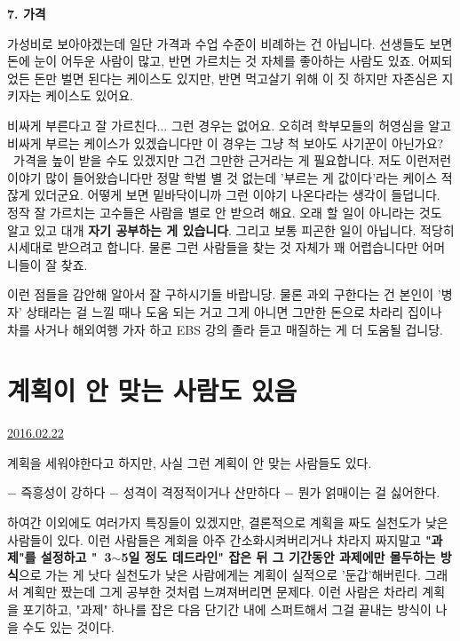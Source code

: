 \textbf{7. 가격}
\vspace{5mm}

가성비로 보아야겠는데 일단 가격과 수업 수준이 비례하는 건 아닙니다.
선생들도 보면 돈에 눈이 어두운 사람이 많고, 반면 가르치는 것 자체를 좋아하는 사람도 있죠.
어찌되었든 돈만 벌면 된다는 케이스도 있지만, 반면 먹고살기 위해 이 짓 하지만 자존심은 지키자는 케이스도 있어요.
\vspace{5mm}

비싸게 부른다고 잘 가르친다... 그런 경우는 없어요. 오히려 학부모들의 허영심을 알고 비싸게 부르는 케이스가 있겠습니다만
이 경우는 그냥 척 보아도 사기꾼이 아닌가요?  가격을 높이 받을 수도 있겠지만 그건 그만한 근거라는 게 필요합니다.
저도 이런저런 이야기 많이 들어왔습니다만 정말 학벌 별 것 없는데 '부르는 게 값이다'라는 케이스 적잖게 있더군요.
어떻게 보면 밑바닥이니까 그런 이야기 나온다라는 생각이 들덥니다.
정작 잘 가르치는 고수들은 사람을 별로 안 받으려 해요. 오래 할 일이 아니라는 것도 알고 있고 대개 \textbf{자기 공부하는 게 있습니다}.
그리고 보통 피곤한 일이 아닙니다. 적당히 시세대로 받으려고 합니다.
물론 그런 사람들을 찾는 것 자체가 꽤 어렵습니다만 어머니들이 잘 찾죠.
\vspace{5mm}

이런 점들을 감안해 알아서 잘 구하시기들 바랍니당.
물론 과외 구한다는 건 본인이 '병자' 상태라는 걸 느낄 때나 도움 되는 거고
그게 아니면 그만한 돈으로 차라리 집이나 차를 사거나 해외여행 가자 하고 EBS 강의 졸라 듣고 매질하는 게 더 도움될 겁니당.













\section{계획이 안 맞는 사람도 있음}
\href{https://www.kockoc.com/Apoc/645403}{2016.02.22}

\vspace{5mm}

계획을 세워야한다고 하지만, 사실 그런 계획이 안 맞는 사람들도 있다.
\vspace{5mm}

$-$ 즉흥성이 강하다
$-$ 성격이 격정적이거나 산만하다
$-$ 뭔가 얽매이는 걸 싫어한다.
\vspace{5mm}

하여간 이외에도 여러가지 특징들이 있겠지만, 결론적으로 계획을 짜도 실천도가 낮은 사람들이 있다.
이런 사람들은 계회을 아주 간소화시켜버리거나 차라지 짜지말고
\textbf{"과제"를 설정하고 " 3$\sim$5일 정도 데드라인" 잡은 뒤 그 기간동안 과제에만 몰두하는 방식}으로 가는 게 낫다
실천도가 낮은 사람에게는 계획이 실적으로 '둔갑'해버린다. 그래서 계획만 짰는데 그게 공부한 것처럼 느껴져버리면 문제다.
이런 사람은 차라리 계획을 포기하고, "과제" 하나를 잡은 다음 단기간 내에 스퍼트해서 그걸 끝내는 방식이 나을 수도 있는 것이다.
\vspace{5mm}

